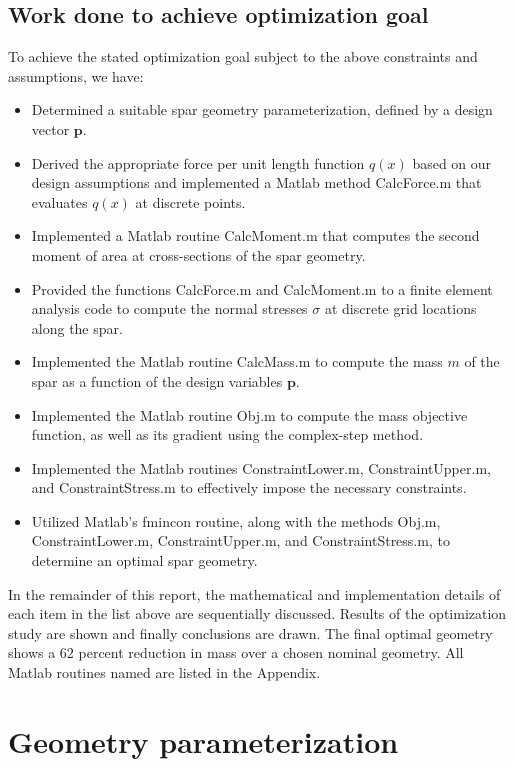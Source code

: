 \documentclass[11pt]{article}
\newcommand{\bs}[1] {\boldsymbol{#1}}
\begin{document}
\subsection{Work done to achieve optimization goal}

To achieve the stated optimization goal subject to the above
constraints and assumptions, we have:
\begin{itemize}
\item Determined a suitable spar geometry parameterization,
defined by a design vector $\bs{p}$.
\item Derived the appropriate force per unit length function
$q(x)$ based on our design assumptions and implemented a Matlab
method CalcForce.m that evaluates $q(x)$ at discrete points.
\item Implemented a Matlab routine CalcMoment.m that computes
the second moment of area at cross-sections of the spar geometry.
\item Provided the functions CalcForce.m and CalcMoment.m to a
finite element analysis code to compute the normal stresses
$\sigma$ at discrete grid locations along the spar.
\item Implemented the Matlab routine CalcMass.m to compute
the mass $m$ of the spar as a function of the design variables
$\bs{p}$.
\item Implemented the Matlab routine Obj.m to compute the
mass objective function, as well as its gradient using
the complex-step method.
\item Implemented the Matlab routines ConstraintLower.m,
ConstraintUpper.m, and ConstraintStress.m to effectively
impose the necessary constraints.
\item Utilized Matlab's fmincon routine, along with the methods
Obj.m, ConstraintLower.m, ConstraintUpper.m, and ConstraintStress.m,
to determine an optimal spar geometry.
\end{itemize}

In the remainder of this report, the mathematical and
implementation details of each item
in the list above are sequentially discussed.
Results of the optimization study are shown and finally
conclusions are drawn. The final optimal geometry shows a
$62$ percent reduction in mass over a chosen nominal
geometry. All Matlab routines named are listed
in the Appendix.

\section{Geometry parameterization}
\end{document}
